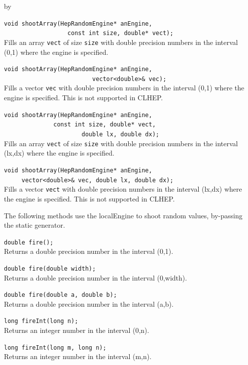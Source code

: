\documentclass[twoside]{article}
\newcommand{\comp}[1]{\texttt{#1}}%
\newcommand{\entrylabel}[1]{\mbox{\textbf{{#1}}}\hfil}%
\newenvironment{entry}
{\begin{list}{}%
    {\renewcommand{\makelabel}{\entrylabel}%
     \setlength{\labelwidth}{90pt}%
     \setlength{\leftmargin}{\labelwidth}
     \advance\leftmargin by \labelsep%
      }%
    }%
  {\end{list}}
\newcommand{\Entrylabel}[1]%
{\raisebox{0pt}[1ex][0pt]{\makebox[\labelwidth][l]%
    {\parbox[t]{\labelwidth}{\hspace{0pt}\textbf{{#1}}}}}}
\newenvironment{Entry}%
{\renewcommand{\entrylabel}{\Entrylabel}\begin{entry}}%
  {\end{entry}}
\begin{document}
\begin{Entry}
    \verb+void shootArray(HepRandomEngine* anEngine,+\\
    \verb+                  const int size, double* vect);+\\
    Fills an array \comp{vect} of size \comp{size} with double
    precision numbers in the interval (0,1) where the engine is
    specified.

    \verb+void shootArray(HepRandomEngine* anEngine,+\\
    \verb+                         vector<double>& vec);+\\
    Fills a vector \comp{vec} with double
    precision numbers in the interval (0,1) where the engine is
    specified.  This is not supported in CLHEP.
    
   \verb+void shootArray(HepRandomEngine* anEngine,+\\ 
   \verb+              const int size, double* vect,+\\
   \verb+                      double lx, double dx);+\\
   Fills an array \comp{vect} of size \comp{size} with double
   precision numbers in the interval (lx,dx) where the engine is
   specified.

   \verb+void shootArray(HepRandomEngine* anEngine,+\\ 
   \verb+     vector<double>& vec, double lx, double dx);+\\
   Fills a vector \comp{vect} with double
   precision numbers in the interval (lx,dx) where the engine is
   specified.  This is not supported in CLHEP.
   
  The following methods use the localEngine to shoot random values,
  by-passing the static generator.

   \verb+double fire();+\\
   Returns a double precision number in the interval (0,1).
  
   \verb+double fire(double width);+\\
   Returns a double precision number in the interval (0,width).
   
   \verb+double fire(double a, double b);+\\
   Returns a double precision number in the interval (a,b).

   \verb+long fireInt(long n);+\\
   Returns an integer number in the interval (0,n).
  
   \verb+long fireInt(long m, long n);+\\
   Returns an integer number in the interval (m,n).


\end{Entry}
\end{document}
